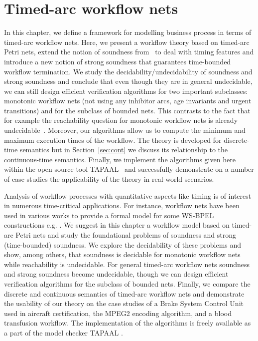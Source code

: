 \chapter{Timed-arc workflow nets}\label{chapter:c5}

In this chapter, we define a framework for modelling business process in terms of timed-arc workflow nets. Here, 
we present a workflow theory based on timed-arc Petri nets,
extend the notion of soundness from~\cite{Aalst97} to deal with 
timing features and introduce a new notion of strong soundness
that guarantees time-bounded workflow termination. We study
the decidability/undecidability of soundness and strong soundness
and conclude that even though they are in general undecidable,
we can still design efficient verification algorithms for two important
subclasses: monotonic workflow nets 
(not using any inhibitor arcs, age invariants and urgent transitions)
and for the subclass of bounded nets. 
This contrasts to the fact that for example the reachability
question for monotonic workflow nets is already 
undecidable~\cite{RGE:reachability}. 
Moreover, our algorithms 
allow us to compute the minimum and maximum execution times of the
workflow. The theory is developed for
discrete-time semantics but in Section~\ref{sec:cont} we discuss its
relationship to the continuous-time semantics. Finally, we implement
the algorithms given here within the open-source tool 
TAPAAL~\cite{DJJJMS:TACAS:12} and successfully demonstrate on a number of 
case studies the applicability of the theory in real-world scenarios.

Analysis of workflow processes with quantitative aspects
like timing is of interest in numerous time-critical applications. 
For instance, workflow nets have been used in various works to provide a formal
model for some WS-BPEL constructions e.g. \cite{AalstJL05,Ouyang2007,AalstL08,LohmannK08,Lohmann07}.
We suggest in this chapter a workflow model based on timed-arc Petri nets and study
the foundational problems of soundness and strong (time-bounded) soundness.
We explore the decidability of these problems
and show, among others, that soundness is decidable for monotonic 
workflow nets while reachability is undecidable.
For general timed-arc workflow nets soundness and
strong soundness become undecidable, though we can design efficient
verification algorithms for the subclass of bounded nets. 
Finally, we compare the discrete and continuous semantics of timed-arc
workflow nets and demonstrate the usability of our theory on
the case studies of a Brake System Control Unit used in aircraft certification,
the MPEG2 encoding algorithm, and 
a blood transfusion workflow.
The implementation of the algorithms is  
freely available as a part of the model checker TAPAAL \cite{tapaal}.

